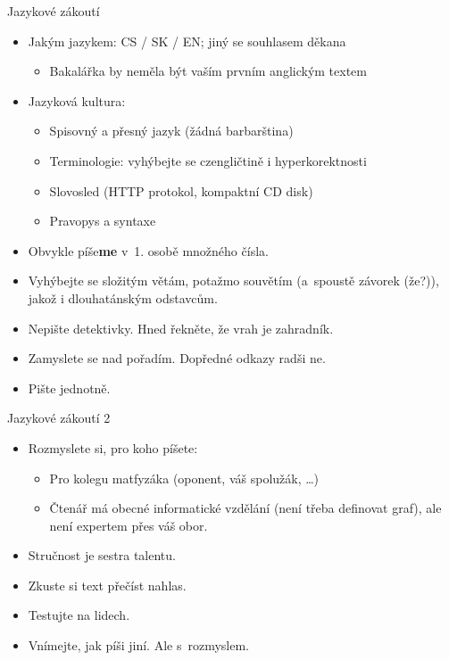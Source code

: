 \documentclass{beamer}
\begin{document}
\begin{frame}{Jazykové zákoutí}

\begin{itemize}
\item Jakým jazykem: CS / SK / EN; jiný se souhlasem děkana
   \begin{itemize}
   \item Bakalářka by neměla být vaším prvním anglickým textem
   \end{itemize}
\item Jazyková kultura:
   \begin{itemize}
   \item Spisovný a přesný jazyk (žádná barbarština)
   \item Terminologie: vyhýbejte se czengličtině i hyperkorektnosti
   \item Slovosled (HTTP protokol, kompaktní CD disk)
   \item Pravopys a syntaxe
   \end{itemize}
\item Obvykle píše{\bf me} v~1. osobě množného čísla.
\item Vyhýbejte se složitým větám, potažmo souvětím (a~spoustě
   závorek (že?)), jakož i dlouhatánským odstavcům.
\item Nepište detektivky. Hned řekněte, že vrah je zahradník.
\item Zamyslete se nad pořadím. Dopředné odkazy radši ne.
\item Pište jednotně.
\end{itemize}

\end{frame}

\begin{frame}{Jazykové zákoutí 2}

\begin{itemize}
\item Rozmyslete si, pro koho píšete:
   \begin{itemize}
   \item Pro kolegu matfyzáka (oponent, váš spolužák, \dots)
   \item Čtenář má obecné informatické vzdělání (není třeba definovat graf),
         ale není expertem přes váš obor.
   \end{itemize}
\item Stručnost je sestra talentu.
\item Zkuste si text přečíst nahlas.
\item Testujte na lidech.
\item Vnímejte, jak píši jiní. Ale s~rozmyslem.
\end{itemize}

\end{frame}
\end{document}
